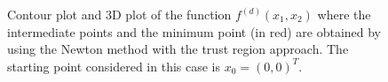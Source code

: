 \documentclass[a4paper,11pt]{article}
\begin{document}
		\begin{figure}[H]
		\centering
		 \quad
		\caption{Contour plot and 3D plot of the function $f^{(d)}(x_{1},x_{2})$ where the intermediate points and the minimum point (in red) are obtained by using the Newton method with the trust region approach. The starting point considered in this case is $x_{0}=(0,0)^{T}$.}
		\label{Fig:func_d_x0_2_trustreg}
	\end{figure}
	
\end{document}
